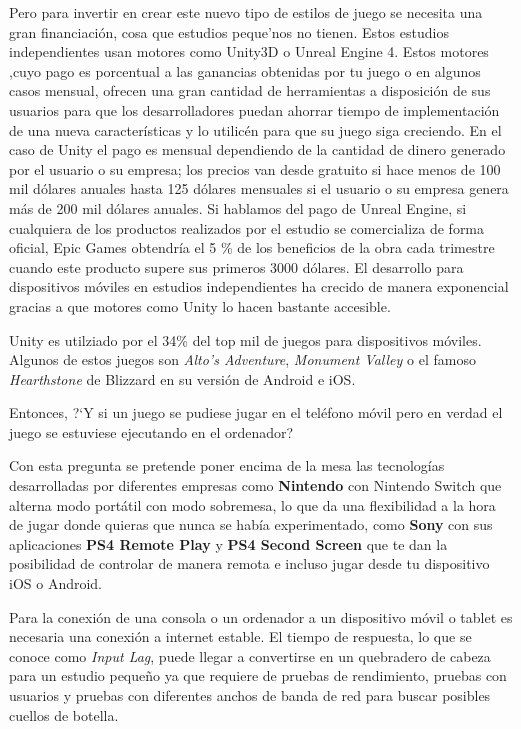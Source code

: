 Pero para invertir en crear este nuevo tipo de estilos de juego se necesita una gran financiaci\'on,
 cosa que estudios peque'nos no tienen.  Estos estudios independientes usan motores como Unity3D o Unreal Engine 4.
 Estos motores ,cuyo pago es porcentual a las ganancias obtenidas por tu juego o en algunos casos mensual, ofrecen una gran cantidad de herramientas a disposici\'on 
de sus usuarios para que los desarrolladores puedan ahorrar tiempo de implementaci\'on de una nueva caracter\'isticas y lo utilic\'en para que su juego siga creciendo.
En el caso de Unity el pago es mensual dependiendo de la cantidad de dinero generado por el usuario o su empresa;
 los precios van desde gratuito si hace menos de 100 mil d\'olares anuales hasta 125 d\'olares mensuales si el usuario o su empresa genera m\'as de 200 mil d\'olares
  anuales. 
  Si hablamos del pago de Unreal Engine, si cualquiera de los productos realizados por el estudio se comercializa de forma oficial, Epic Games obtendr\'ia el 5 \% de los beneficios de la obra cada trimestre cuando este producto supere sus primeros 3000 d\'olares.
El desarrollo para dispositivos m\'oviles en estudios independientes ha crecido de manera exponencial gracias a que motores como Unity lo hacen bastante accesible. 

Unity es utilziado por el 34\% del top mil de juegos para dispositivos m\'oviles. Algunos de estos juegos son \textit{Alto's Adventure}, \textit{Monument Valley} o el famoso \textit{Hearthstone} de Blizzard en su versi\'on de Android e iOS.

Entonces,
 ?`Y si un juego se pudiese jugar en el tel\'efono m\'ovil pero en verdad el juego se estuviese ejecutando en el ordenador?

Con esta pregunta se pretende poner encima de la mesa las tecnolog\'ias desarrolladas por diferentes empresas como \textbf{Nintendo} con Nintendo Switch que alterna modo port\'atil con modo sobremesa, lo que da una flexibilidad a la hora de jugar donde quieras que nunca se hab\'ia experimentado, 
como \textbf{Sony} con sus aplicaciones \textbf{PS4 Remote Play} y \textbf{PS4 Second Screen} que te dan la posibilidad de controlar de manera remota e incluso jugar desde tu dispositivo iOS o Android.

Para la conexi\'on de una consola o un ordenador a un dispositivo m\'ovil o tablet es necesaria una conexi\'on a internet estable. El tiempo de respuesta, lo que se conoce como  \textit{Input Lag}, puede llegar a convertirse en un quebradero de cabeza para un estudio peque\~no ya que requiere de pruebas de rendimiento, pruebas con usuarios y pruebas con diferentes anchos de banda de red para buscar posibles cuellos de botella. 

